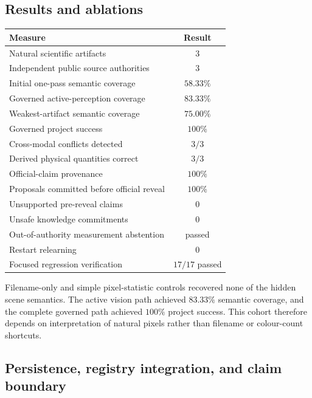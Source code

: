 \subsection{Results and ablations}
\label{subsec:arena-v6-results}

\begin{center}
\small
\begin{tabular}{|>{\raggedright\arraybackslash}p{7.2cm}|c|}
\hline
\textbf{Measure} & \textbf{Result} \\
\hline
Natural scientific artifacts & $3$ \\
\hline
Independent public source authorities & $3$ \\
\hline
Initial one-pass semantic coverage & $58.33\%$ \\
\hline
Governed active-perception coverage & $83.33\%$ \\
\hline
Weakest-artifact semantic coverage & $75.00\%$ \\
\hline
Governed project success & $100\%$ \\
\hline
Cross-modal conflicts detected & $3/3$ \\
\hline
Derived physical quantities correct & $3/3$ \\
\hline
Official-claim provenance & $100\%$ \\
\hline
Proposals committed before official reveal & $100\%$ \\
\hline
Unsupported pre-reveal claims & $0$ \\
\hline
Unsafe knowledge commitments & $0$ \\
\hline
Out-of-authority measurement abstention & passed \\
\hline
Restart relearning & $0$ \\
\hline
Focused regression verification & $17/17$ passed \\
\hline
\end{tabular}
\end{center}

Filename-only and simple pixel-statistic controls recovered none of the hidden
scene semantics.  The active vision path achieved $83.33\%$ semantic coverage,
and the complete governed path achieved $100\%$ project success.  This cohort
therefore depends on interpretation of natural pixels rather than filename or
colour-count shortcuts.


\subsection{Persistence, registry integration, and claim boundary}
\label{subsec:arena-v6-boundary}

